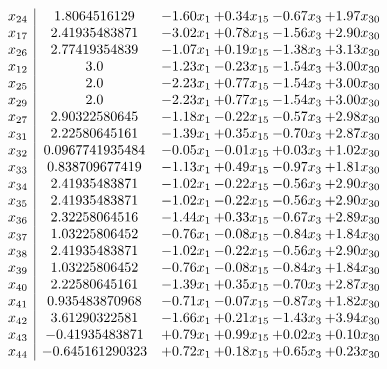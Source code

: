 \documentclass[8pt]{article}
\begin{document}
\[\begin{array}{c| c c@{\hskip 2pt} c@{\hskip 2pt} c@{\hskip 2pt} c@{\hskip 2pt} }
 x_{24}   &  1.8064516129 & -1.60 x_{1} & +  0.34 x_{15} & -0.67 x_{3} & +  1.97 x_{30}\\
 x_{17}   &  2.41935483871 & -3.02 x_{1} & +  0.78 x_{15} & -1.56 x_{3} & +  2.90 x_{30}\\
 x_{26}   &  2.77419354839 & -1.07 x_{1} & +  0.19 x_{15} & -1.38 x_{3} & +  3.13 x_{30}\\
 x_{12}   &  3.0 & -1.23 x_{1} & -0.23 x_{15} & -1.54 x_{3} & +  3.00 x_{30}\\
 x_{25}   &  2.0 & -2.23 x_{1} & +  0.77 x_{15} & -1.54 x_{3} & +  3.00 x_{30}\\
 x_{29}   &  2.0 & -2.23 x_{1} & +  0.77 x_{15} & -1.54 x_{3} & +  3.00 x_{30}\\
 x_{27}   &  2.90322580645 & -1.18 x_{1} & -0.22 x_{15} & -0.57 x_{3} & +  2.98 x_{30}\\
 x_{31}   &  2.22580645161 & -1.39 x_{1} & +  0.35 x_{15} & -0.70 x_{3} & +  2.87 x_{30}\\
 x_{32}   &  0.0967741935484 & -0.05 x_{1} & -0.01 x_{15} & +  0.03 x_{3} & +  1.02 x_{30}\\
 x_{33}   &  0.838709677419 & -1.13 x_{1} & +  0.49 x_{15} & -0.97 x_{3} & +  1.81 x_{30}\\
 x_{34}   &  2.41935483871 & -1.02 x_{1} & -0.22 x_{15} & -0.56 x_{3} & +  2.90 x_{30}\\
 x_{35}   &  2.41935483871 & -1.02 x_{1} & -0.22 x_{15} & -0.56 x_{3} & +  2.90 x_{30}\\
 x_{36}   &  2.32258064516 & -1.44 x_{1} & +  0.33 x_{15} & -0.67 x_{3} & +  2.89 x_{30}\\
 x_{37}   &  1.03225806452 & -0.76 x_{1} & -0.08 x_{15} & -0.84 x_{3} & +  1.84 x_{30}\\
 x_{38}   &  2.41935483871 & -1.02 x_{1} & -0.22 x_{15} & -0.56 x_{3} & +  2.90 x_{30}\\
 x_{39}   &  1.03225806452 & -0.76 x_{1} & -0.08 x_{15} & -0.84 x_{3} & +  1.84 x_{30}\\
 x_{40}   &  2.22580645161 & -1.39 x_{1} & +  0.35 x_{15} & -0.70 x_{3} & +  2.87 x_{30}\\
 x_{41}   &  0.935483870968 & -0.71 x_{1} & -0.07 x_{15} & -0.87 x_{3} & +  1.82 x_{30}\\
 x_{42}   &  3.61290322581 & -1.66 x_{1} & +  0.21 x_{15} & -1.43 x_{3} & +  3.94 x_{30}\\
 x_{43}   &  -0.41935483871 & +  0.79 x_{1} & +  0.99 x_{15} & +  0.02 x_{3} & +  0.10 x_{30}\\
 x_{44}   &  -0.645161290323 & +  0.72 x_{1} & +  0.18 x_{15} & +  0.65 x_{3} & +  0.23 x_{30}\\

\end{array}\]
\end{document}
